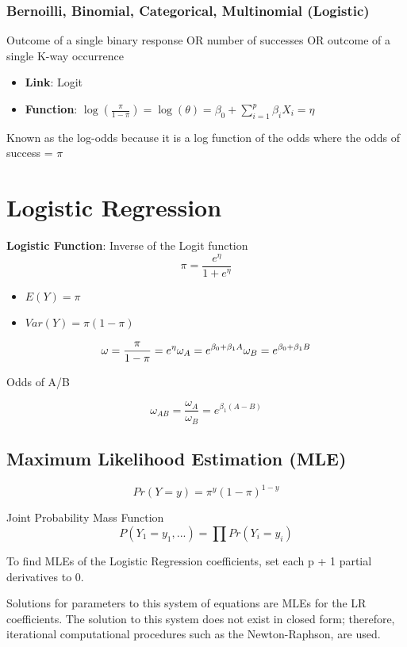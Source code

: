 \documentclass[11pt]{article}
\begin{document}
\subsubsection{Bernoilli, Binomial, Categorical, Multinomial (Logistic)}
\label{sec:org1351499}
Outcome of a single binary response OR number of successes OR outcome of
a single K-way occurrence
\begin{itemize}
\item \textbf{Link}: Logit
\item \textbf{Function}: \(\log(\frac{\pi}{1 - \pi}) = \log(\theta) = \beta_0 + \sum_{i = 1}^p \beta_i X_i = \eta\)
\end{itemize}

Known as the log-odds because it is a log function of the odds where the
odds of success = \(\pi\)

\section{Logistic Regression}
\label{sec:orgd6ab6cc}
\textbf{Logistic Function}: Inverse of the Logit function $$
    \pi = \frac{e^{\eta}}{1 + e^{\eta}}
$$

\begin{itemize}
\item \(E(Y) = \pi\)
\item \(Var(Y) = \pi (1 - \pi)\)
\end{itemize}

$$
    \omega = \frac{\pi}{1 - \pi} = e^{\eta} \newline
    \omega_A = e^{\beta_0 + \beta_1A} \newline
    \omega_B = e^{\beta_0 + \beta_1B} \newline
$$

Odds of A/B

$$
    \omega_{AB} = \frac{\omega_A}{\omega_B} = e^{\beta_1(A - B)}
$$

\subsection{Maximum Likelihood Estimation (MLE)}
\label{sec:org692633f}
$$
    Pr(Y = y) = \pi^y (1 - \pi)^{1 - y}
$$

Joint Probability Mass Function $$
    P(Y_1 = y_1, ...) = \prod Pr(Y_i = y_i)
$$

To find MLEs of the Logistic Regression coefficients, set each p + 1
partial derivatives to 0.

Solutions for parameters to this system of equations are MLEs for the LR
coefficients. The solution to this system does not exist in closed form;
therefore, iterational computational procedures such as the
Newton-Raphson, are used.
\end{document}
